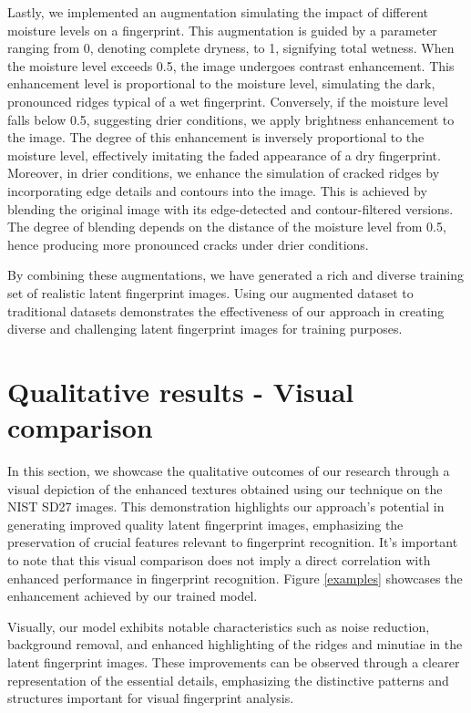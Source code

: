 \documentclass[twocolumn, switch]{article} %
\begin{document}
Lastly, we implemented an augmentation simulating the impact of different moisture levels on a fingerprint. This augmentation is guided by a parameter ranging from 0, denoting complete dryness, to 1, signifying total wetness. When the moisture level exceeds 0.5, the image undergoes contrast enhancement. This enhancement level is proportional to the moisture level, simulating the dark, pronounced ridges typical of a wet fingerprint. Conversely, if the moisture level falls below 0.5, suggesting drier conditions, we apply brightness enhancement to the image. The degree of this enhancement is inversely proportional to the moisture level, effectively imitating the faded appearance of a dry fingerprint. Moreover, in drier conditions, we enhance the simulation of cracked ridges by incorporating edge details and contours into the image. This is achieved by blending the original image with its edge-detected and contour-filtered versions. The degree of blending depends on the distance of the moisture level from 0.5, hence producing more pronounced cracks under drier conditions.

By combining these augmentations, we have generated a rich and diverse training set of realistic latent fingerprint images. Using our augmented dataset to traditional datasets demonstrates the effectiveness of our approach in creating diverse and challenging latent fingerprint images for training purposes.

\vspace{-0.25cm}

\section{Qualitative results - Visual comparison}

In this section, we showcase the qualitative outcomes of our research through a visual depiction of the enhanced textures obtained using our technique on the NIST SD27 images. This demonstration highlights our approach's potential in generating improved quality latent fingerprint images, emphasizing the preservation of crucial features relevant to fingerprint recognition. It's important to note that this visual comparison does not imply a direct correlation with enhanced performance in fingerprint recognition. Figure \ref{examples} showcases the enhancement achieved by our trained model.

Visually, our model exhibits notable characteristics such as noise reduction, background removal, and enhanced highlighting of the ridges and minutiae in the latent fingerprint images. These improvements can be observed through a clearer representation of the essential details, emphasizing the distinctive patterns and structures important for visual fingerprint analysis.
\end{document}
